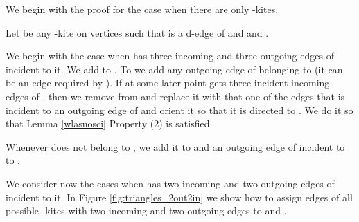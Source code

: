 \documentclass[a4, 11pt]{article}
\newcommand{\<}{\langle}
\renewcommand{\>}{\rangle}
\begin{document}
We begin with the proof for the case when there are only -kites. 

Let  be any -kite on vertices  such that  is a d-edge of  and  and . 


We begin with the case when  has three incoming and three outgoing edges of  incident to it. We add  to . To  we add any outgoing edge of  belonging to  (it can be an edge required by ).  If at some later point  gets three incident incoming edges of , then we remove  from  and replace it with that one of the edges  that is incident to an outgoing edge of  and orient it so that it is directed to . We do it so that Lemma \ref{wlasnosci} Property (2) is satisfied.

Whenever  does not belong to , we add it to  and an outgoing edge of  incident to  to .

 We consider now the cases when  has two incoming and two outgoing edges
of  incident to it. In  Figure \ref{fig:triangles_2out2in} we show how to assign edges of all possible -kites with two incoming and two outgoing edges to  and .
\end{document}
